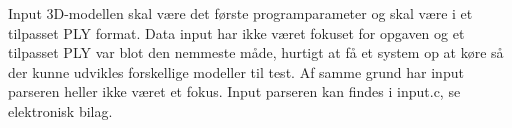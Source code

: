 Input 3D-modellen skal være det første programparameter og skal være i et tilpasset PLY format. Data input har ikke været fokuset for opgaven og et tilpasset PLY var blot den nemmeste måde, hurtigt at få et system op at køre så der kunne udvikles forskellige modeller til test. Af samme grund har input parseren heller ikke været et fokus. Input parseren kan findes i input.c, se elektronisk bilag. 